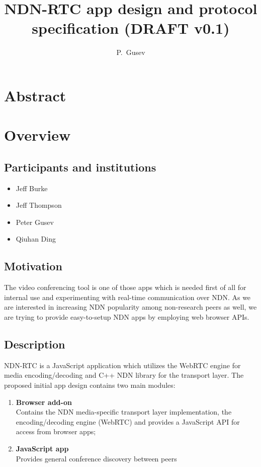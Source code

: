 \documentclass[12pt]{article}
\author{P.~Gusev}
\title{NDN-RTC app design and protocol specification (DRAFT v0.1)}
\begin{document}
\maketitle
\newpage

\section*{Abstract}
\tableofcontents

\newpage
\section{Overview}
\subsection{Participants and institutions}
\begin{itemize}
\item Jeff Burke
\item Jeff Thompson
\item Peter Gusev
\item Qiuhan Ding
\end{itemize}

\subsection{Motivation}
The video conferencing tool is one of those apps which is needed first of all for internal use and experimenting with real-time communication over NDN. As we are interested in increasing NDN popularity among non-research peers as well, we are trying to provide easy-to-setup NDN apps by employing web browser APIs.

\subsection{Description}
NDN-RTC is a JavaScript application which utilizes the WebRTC engine for media encoding/decoding and C++ NDN library for the transport layer. The proposed initial app design contains two main modules: 
\begin{enumerate}
\item \textbf{Browser add-on} \\
Contains the NDN media-specific transport layer implementation, the encoding/decoding engine (WebRTC) and provides a JavaScript API for access from browser apps;
\item \textbf{JavaScript app} \\
Provides general conference discovery between peers
\end{enumerate}
\end{document}
